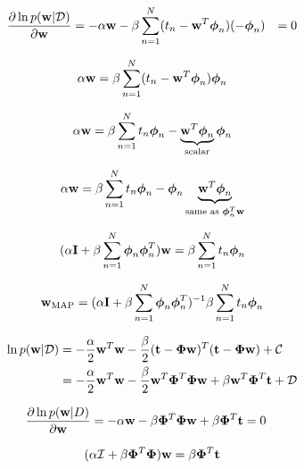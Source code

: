 \documentclass[12pt,a4paper]{article}
\newcommand{\Data}{\mathcal{D}}
\newcommand{\DataIndex}{n}
\newcommand{\eye}{{\bf I}}
\newcommand{\tscalar}{t}
\newcommand{\tvec}{{\bf \tscalar}}
\newcommand{\wscalar}{w}
\newcommand{\wvec}{{\bf \wscalar}}
\newcommand{\wvecMAP}{\wvec_{\text{MAP}}}
\newcommand{\tn}{\tscalar_{\DataIndex}}
\newcommand{\phivec}{\boldsymbol{\phi}}
\newcommand{\Phimat}{\boldsymbol{\Phi}}
\newcommand{\phivecn}{\phivec_{\DataIndex}}
\begin{document}
\begin{enumerate}
		  \begin{align*}
		  \frac{\partial \ln p(\wvec | \Data)}{\partial \wvec} &= - \alpha \wvec - \beta \sum_{n=1}^{N} (\tn- \wvec^T \phivecn)(-\phivecn) &= 0
		  \end{align*}
		  
		  \begin{align*}
		  \alpha \wvec = \beta \sum_{n=1}^{N} (\tn- \wvec^T \phivecn) \phivecn
		  \end{align*}
		  
		  \begin{align*}
		  \alpha \wvec = \beta \sum_{n=1}^{N} \tn \phivecn - \underbrace{\wvec^T \phivecn}_{\text{scalar}} \phivecn
		  \end{align*}
		  
		  \begin{align*}
		  \alpha \wvec = \beta \sum_{n=1}^{N} \tn \phivecn - \phivecn \underbrace{\wvec^T \phivecn}_{\text{same as } \phivecn^{T} \wvec}
		  \end{align*}
		  
		  \begin{align*}
		  (\alpha \eye + \beta \sum_{n=1}^{N} \phivecn\phivecn^T) \wvec = \beta \sum_{n=1}^{N} \tn \phivecn 
		  \end{align*}
		  
		  \begin{align*}
		  \wvecMAP = (\alpha \eye + \beta \sum_{n=1}^{N} \phivecn\phivecn^T)^{-1} \beta \sum_{n=1}^{N} t_n \phivecn
		  \end{align*}
		  
		  \begin{align*}
		  \ln{p(\wvec | \Data)} &= -\frac{\alpha}{2} \wvec^T \wvec - \frac{\beta}{2} (\tvec - \Phimat \wvec)^T (\tvec - \Phimat \wvec) + \mathcal{C} \\
		  &= - \frac{\alpha}{2} \wvec^T\wvec - \frac{\beta}{2}\wvec^T \Phimat^T \Phimat \wvec + \beta \wvec^T \Phimat^T \tvec + \mathcal{D}
		  \end{align*}
		  
		  \begin{align*}
		  \frac{\partial \ln p(\wvec | D)}{\partial \wvec} &= - \alpha \wvec - \beta \mathbf{\Phi}^T\mathbf{\Phi} \wvec + \beta \mathbf{\Phi}^T \tvec = 0 
		  \end{align*}
		  
		  \begin{align*}
		  (\alpha\mathcal{I} + \beta \mathbf{\Phi}^T\mathbf{\Phi})\wvec = \beta\mathbf{\Phi}^T\tvec
		  \end{align*}
		  

\end{enumerate}
\end{document}
